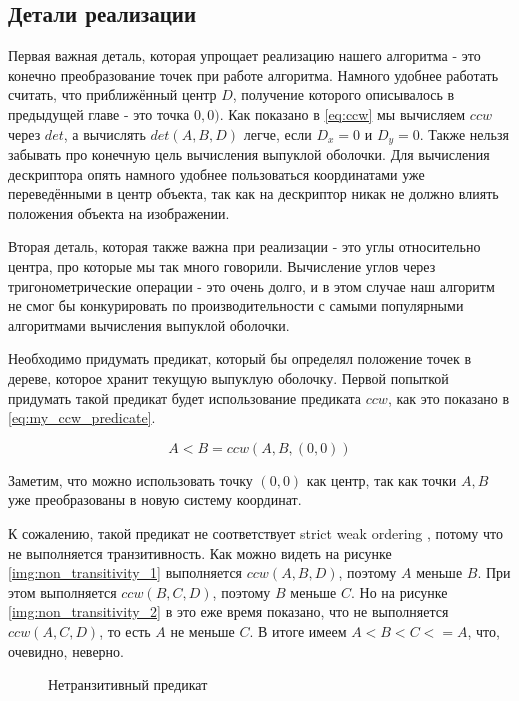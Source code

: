 \subsection{Детали реализации} \label{subsect2_2_2}

Первая важная деталь, которая упрощает реализацию нашего алгоритма - это конечно преобразование точек при работе алгоритма. Намного удобнее работать считать, что приближённый центр $D$, получение которого описывалось в предыдущей главе - это точка $0, 0)$. Как показано в \ref{eq:ccw} мы вычисляем $ccw$ через $det$, а вычислять $det(A, B, D)$ легче, если $D_x = 0$ и $D_y = 0$. Также нельзя забывать про конечную цель вычисления выпуклой оболочки. Для вычисления дескриптора опять намного удобнее пользоваться координатами уже переведёнными в центр объекта, так как на дескриптор никак не должно влиять положения объекта на изображении.

Вторая деталь, которая также важна при реализации - это углы относительно центра, про которые мы так много говорили. Вычисление углов через тригонометрические операции - это очень долго, и в этом случае наш алгоритм не смог бы конкурировать по производительности с самыми популярными алгоритмами вычисления выпуклой оболочки.

Необходимо придумать предикат, который бы определял положение точек в дереве, которое хранит текущую выпуклую оболочку. Первой попыткой придумать такой предикат будет использование предиката $ccw$, как это показано в \ref{eq:my_ccw_predicate}.

\begin{equation}\label{eq:my_ccw_predicate}
A<B=ccw(A, B, (0, 0))
\end{equation}

Заметим, что можно использовать точку $(0, 0)$ как центр, так как точки $A, B$ уже преобразованы в новую систему координат.

К сожалению, такой предикат не соответствует strict weak ordering \cite{isoCppStd2017}, потому что не выполняется транзитивность. Как можно видеть на рисунке \ref{img:non_transitivity_1} выполняется $ccw(A, B, D)$, поэтому $A$ меньше $B$. При этом выполняется $ccw(B, C, D)$, поэтому $B$ меньше $C$. Но на рисунке \ref{img:non_transitivity_2} в это еже время показано, что не выполняется $ccw(A, C, D)$, то есть $A$ не меньше $C$. В итоге имеем $A < B < C <= A$, что, очевидно, неверно.

\begin{figure}[H]
	{\centering
		\hfill
		\subbottom[\label{img:non_transitivity_1}]{%
			}
		\hfill
		\subbottom[\label{img:non_transitivity_2}]{%
			}
		\hfill
	}
	\caption{Нетранзитивный предикат}
	\label{img:non_transitivity}
\end{figure}

